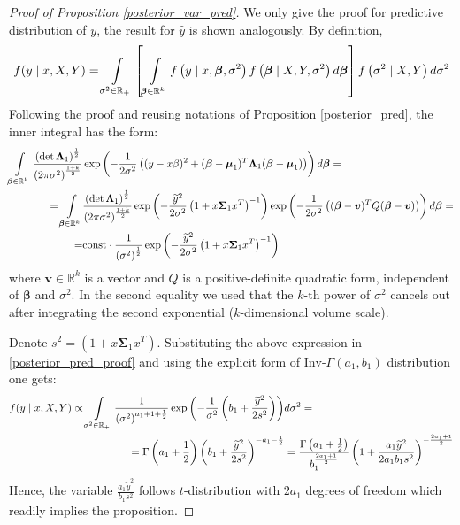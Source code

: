\documentclass[10pt,fleqn]{amsart}
\theoremstyle{definition}
\theoremstyle{remark}
\numberwithin{equation}{section}
\newcommand{\RR}{\mathbb{R}}
\newcommand{\const}{\text{const}}
\newcommand{\bbeta}{\boldsymbol{\beta}}
\newcommand{\mmu}{\boldsymbol{\mu}}
\newcommand{\SSigma}{\boldsymbol{\Sigma}}
\newcommand{\LLambda}{\boldsymbol{\Lambda}}
\newcommand{\ytilde}{\widetilde{y}}
\newcommand{\invGamma}{\text{Inv-}\Gamma}
\begin{document}
\begin{proof}[Proof of Proposition \ref{posterior_var_pred}]
We only give the proof for predictive distribution of $y$, the result for $\widehat{y}$ is shown analogously. By definition,
\begin{equation}\label{posterior_pred_proof}\begin{split}
    f(y\mid x, X, Y)=\int\displaylimits_{\sigma^2\in\RR_+}
    \left[\int\displaylimits_{\bbeta\in\RR^k}f\left(y\mid x,\bbeta,\sigma^2\right)f\left(\bbeta\mid X,Y,\sigma^2\right)d\bbeta\right]
    f\left(\sigma^2\mid X, Y\right)d\sigma^2
\end{split}\end{equation}
Following the proof and reusing notations of Proposition \ref{posterior_pred}, the inner integral has the form:
\begin{equation*}\begin{split}
    \int\displaylimits_{\bbeta\in\RR^k}\frac{\left(\det\LLambda_1\right)^{\frac 12}}{\left(2\pi\sigma^2\right)^{\frac{1+k}2}}
    &\exp\left(-\frac 1{2\sigma^2}\left((y-x\beta)^2+(\bbeta-\mmu_1)^T\LLambda_1(\bbeta-\mmu_1)\right)\right)d\bbeta=\\
    =\int\displaylimits_{\bbeta\in\RR^k}&\frac{\left(\det\LLambda_1\right)^{\frac 12}}{\left(2\pi\sigma^2\right)^{\frac{1+k}2}}
    \exp\left(-\frac{\ytilde^2}{2\sigma^2}\left(1+x\SSigma_1 x^T\right)^{-1}\right)
    \exp\left(-\frac 1{2\sigma^2}\left((\bbeta-\boldsymbol{v})^TQ(\bbeta-\boldsymbol{v})\right)\right)d\bbeta=\\
    =&\const\cdot\frac 1{\left(\sigma^2\right)^\frac 1 2}\exp\left(-\frac{\ytilde^2}{2\sigma^2}\left(1+x\SSigma_1 x^T\right)^{-1}\right)
\end{split}\end{equation*}
where $\boldsymbol{v}\in\RR^k$ is a vector and $Q$ is a positive-definite quadratic form,  independent of $\bbeta$ and $\sigma^2$.
In the second equality we used that the $k$-th power of $\sigma^2$ cancels out after integrating the second exponential
($k$-dimensional volume scale).

Denote $s^2=\left(1+x\SSigma_1 x^T\right)$. Substituting the above expression in \ref{posterior_pred_proof} and using the explicit form
of $\invGamma(a_1, b_1)$ distribution one gets:
\begin{equation*}\begin{split}
    f(y\mid x, X, Y)\propto\int\displaylimits_{\sigma^2\in\RR_+}\frac 1{\left(\sigma^2\right)^{a_1+1+\frac 1 2}}
    \exp\left(-\frac 1{\sigma^2}\left(b_1+\frac{\ytilde^2}{2s^2}\right)\right)&d\sigma^2=\\
    =\Gamma\left(a_1+\frac 1 2\right)\left(b_1+\frac{\ytilde^2}{2s^2}\right)^{-a_1-\frac 1 2}&=
    \frac{\Gamma\left(a_1+\frac 1 2\right)}{b_1^{\frac{2a_1+1}2}}\left(1+\frac{a_1 \ytilde^2 }{2a_1 b_1 s^2}\right)^{-\frac{2a_1+1}2}
\end{split}\end{equation*}
Hence, the variable $\displaystyle\frac{a_1 \ytilde^2 }{b_1 s^2}$ follows $t$-distribution with $2a_1$ degrees of freedom which readily implies the proposition.
\end{proof}
\end{document}
